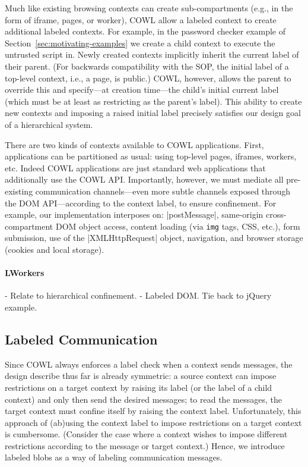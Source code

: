 Much like existing browsing contexts can create sub-compartments
(e.g., in the form of iframe, pages, or worker), COWL allow a labeled
context to create additional labeled contexts.
%
For example, in the password checker example of
Section~\ref{sec:motivating-examples} we create a child context to
execute the untrusted script in.
%
Newly created contexts implicitly inherit the current label of their
parent.
%
(For backwards compatibility with the SOP, the initial label of a
top-level context, i.e., a page, is public.) 
%
COWL, however, allows the parent to override this and specify---at
creation time---the child's initial current label (which must be at
least as restricting as the parent's label).
%
This ability to create new contexts and imposing a raised initial
label precisely satisfies our design goal of a hierarchical system.

There are two kinds of contexts available to COWL applications.
%
First, applications can be partitioned as usual: using top-level
pages, iframes, workers, etc.
%
Indeed COWL applications are just standard web applications that
additionally use the COWL API.
%
Importantly, however, we must mediate all pre-existing communication
channels---even more subtle channels exposed through the DOM
API---according to the context label, to ensure confinement.
%
For example, our implementation interposes on:
%
\js|postMessage|,
same-origin cross-compartment DOM object access,
content loading (via {\tt img} tags, CSS, etc.),
form submission,
use of the \js|XMLHttpRequest| object,
navigation, and
browser storage (cookies and local storage).

\paragraph{LWorkers}
- Relate to hierarchical confinement.
- Labeled DOM. Tie back to jQuery example.

\subsection{Labeled Communication}
\label{sec:system:communication}
Since COWL always enforces a label check when a context sends
messages, the design describe thus far is already symmetric: a source
context can impose restrictions on a target context by raising its
label (or the label of a child context) and only then send the desired
messages; to read the messages, the target context must confine itself
by raising the context label.
%
Unfortunately, this approach of (ab)using the context label to impose
restrictions on a target context is cumbersome.
%
(Consider the case where a context wishes to impose different
restrictions according to the message or target context.)
%
Hence, we introduce labeled blobs as a way of labeling communication
messages.


